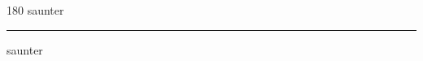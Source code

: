 
\begin{frame}
\begin{center}
\begin{turn}{180}
{\fontsize{2.5cm}{1em}\selectfont saunter}
\end{turn}
\vspace{1em}\par  
\hrule
\vspace{1em}\par  
{\fontsize{2.5cm}{1em}\selectfont saunter}
\end{center}
\end{frame}
